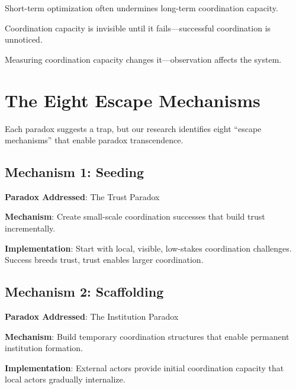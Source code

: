 \documentclass[12pt,letterpaper]{article}
\begin{document}
\begin{theorembox}
Short-term optimization often undermines long-term coordination capacity.
\end{theorembox}

\begin{theorembox}
Coordination capacity is invisible until it fails---successful coordination is unnoticed.
\end{theorembox}

\begin{theorembox}
Measuring coordination capacity changes it---observation affects the system.
\end{theorembox}

\section{The Eight Escape Mechanisms}

Each paradox suggests a trap, but our research identifies eight ``escape mechanisms'' that enable paradox transcendence.

\subsection{Mechanism 1: Seeding}

\textbf{Paradox Addressed}: The Trust Paradox

\textbf{Mechanism}: Create small-scale coordination successes that build trust incrementally.

\textbf{Implementation}: Start with local, visible, low-stakes coordination challenges. Success breeds trust, trust enables larger coordination.

\subsection{Mechanism 2: Scaffolding}

\textbf{Paradox Addressed}: The Institution Paradox

\textbf{Mechanism}: Build temporary coordination structures that enable permanent institution formation.

\textbf{Implementation}: External actors provide initial coordination capacity that local actors gradually internalize.
\end{document}
